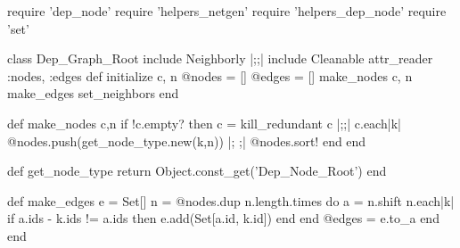 \begin{rubyblock}
require 'dep_node'
require 'helpers_netgen'
require 'helpers_dep_node'
require 'set'

class Dep_Graph_Root
  include Neighborly |;\label{code:dep-graph-includes};|
  include Cleanable
  attr_reader :nodes, :edges
  def initialize c, n
    @nodes = []
    @edges = []
    make_nodes c, n
    make_edges
    set_neighbors
  end
  
  def make_nodes c,n
    if !c.empty? then
      c = kill_redundant c |;\label{code:dep-graph-kill};|
      c.each{|k| @nodes.push(get_node_type.new(k,n))} |;\label{code:dep-graph-push-node} ;|
      @nodes.sort!
    end
  end

  def get_node_type
    return Object.const_get('Dep_Node_Root')
  end

  def make_edges 
    e = Set[]
    n = @nodes.dup
    n.length.times do
      a = n.shift
      n.each{|k| if a.ids - k.ids != a.ids then e.add(Set[a.id, k.id]) end}
    end
    @edges = e.to_a
  end  
end
\end{rubyblock}
